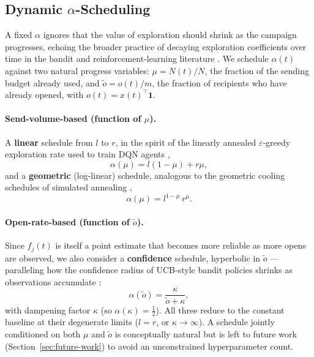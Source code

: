 \subsection{Dynamic $\alpha$-Scheduling}
\label{sec:alpha-scheduling}

A fixed $\alpha$ ignores that the value of exploration should shrink as the
campaign progresses, echoing the broader practice of decaying exploration
coefficients over time in the bandit and reinforcement-learning literature
\citep{auer2002finite}. We schedule $\alpha(t)$ against two natural progress
variables: $\mu = N(t)/N$, the fraction of the sending budget already used,
and $\tilde o = o(t)/m$, the fraction of recipients who have already
opened, with $o(t) = x(t)^\top\mathbf{1}$.

\paragraph{Send-volume-based (function of $\mu$).}
A \textbf{linear} schedule from $l$ to $r$, in the spirit of the linearly
annealed $\varepsilon$-greedy exploration rate used to train DQN agents
\citep{mnih2015human},
\begin{equation}
\label{eq:alpha-linear}
\alpha(\mu) = l(1-\mu) + r\mu,
\end{equation}
and a \textbf{geometric} (log-linear) schedule, analogous to the geometric
cooling schedules of simulated annealing \citep{mahdi2017performance},
\begin{equation}
\label{eq:alpha-geometric}
\alpha(\mu) = l^{1-\mu}\, r^{\mu}.
\end{equation}

\paragraph{Open-rate-based (function of $\tilde o$).}
Since $f_j(t)$ is itself a point estimate that becomes more reliable as
more opens are observed, we also consider a \textbf{confidence} schedule,
hyperbolic in $\tilde o$ --- paralleling how the confidence radius of
UCB-style bandit policies shrinks as observations accumulate
\citep{auer2002finite}:
\begin{equation}
\label{eq:alpha-confidence}
\alpha(\tilde o) = \frac{\kappa}{\tilde o + \kappa},
\end{equation}
with dampening factor $\kappa$ (so $\alpha(\kappa)=\tfrac12$). All three
reduce to the constant baseline at their degenerate limits ($l=r$, or
$\kappa\to\infty$). A schedule jointly conditioned on both $\mu$ and
$\tilde o$ is conceptually natural but is left to future work
(Section~\ref{sec:future-work}) to avoid an unconstrained hyperparameter
count.
